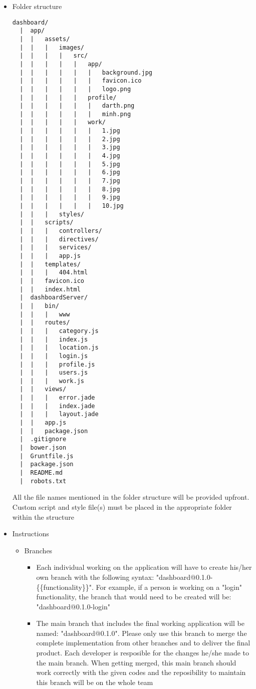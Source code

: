 \documentclass[12pt]{article}
\begin{document}
\begin{itemize}
	\item Folder structure
	\begin{verbatim}
dashboard/
  |  app/
  |  |   assets/
  |  |   |   images/
  |  |   |   |   src/
  |  |   |   |   |   app/
  |  |   |   |   |   |   background.jpg
  |  |   |   |   |   |   favicon.ico
  |  |   |   |   |   |   logo.png
  |  |   |   |   |   profile/
  |  |   |   |   |   |   darth.png
  |  |   |   |   |   |   minh.png
  |  |   |   |   |   work/
  |  |   |   |   |   |   1.jpg
  |  |   |   |   |   |   2.jpg
  |  |   |   |   |   |   3.jpg
  |  |   |   |   |   |   4.jpg
  |  |   |   |   |   |   5.jpg
  |  |   |   |   |   |   6.jpg
  |  |   |   |   |   |   7.jpg
  |  |   |   |   |   |   8.jpg
  |  |   |   |   |   |   9.jpg
  |  |   |   |   |   |   10.jpg
  |  |   |   styles/
  |  |   scripts/
  |  |   |   controllers/
  |  |   |   directives/
  |  |   |   services/
  |  |   |   app.js
  |  |   templates/
  |  |   |   404.html
  |  |   favicon.ico
  |  |   index.html
  |  dashboardServer/
  |	 |	 bin/
  |	 |	 |	 www
  |  |   routes/
  |  |   |   category.js
  |  |   |   index.js
  |  |   |   location.js
  |  |   |   login.js
  |  |   |   profile.js
  |  |   |   users.js
  |  |   |   work.js
  |  |   views/
  |  |   |   error.jade
  |  |   |   index.jade
  |  |   |   layout.jade
  |  |   app.js
  |  |   package.json
  |  .gitignore
  |  bower.json
  |  Gruntfile.js
  |  package.json
  |  README.md
  |  robots.txt
	\end{verbatim}	
All the file names mentioned in the folder structure will be provided upfront. Custom script and style file(s) must be placed in the appropriate folder within the structure
	\item Instructions
	\begin{itemize}
	\item Branches
		\begin{itemize}
		\item Each individual working on the application will have to create his/her own branch with the following syntax: "dashboard@0.1.0-\{\{functionality\}\}". For example, if a person is working on a "login" functionality, the branch that would need to be created will be: "dashboard@0.1.0-login"
		\item The main branch that includes the final working application will be named: "dashboard@0.1.0". Please only use this branch to merge the complete implementation from other branches and to deliver the final product. Each developer is resposible for the changes he/she made to the main branch. When getting merged, this main branch should work correctly with the given codes and the reposibility to maintain this branch will be on the whole team

\end{itemize}
\end{itemize}
\end{itemize}
\end{document}
